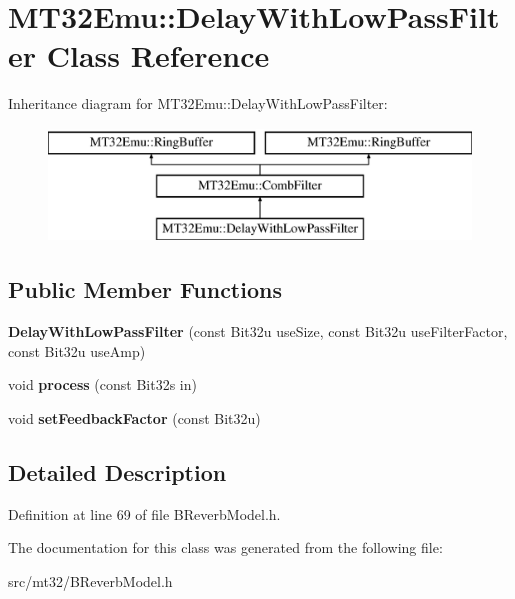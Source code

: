 \hypertarget{classMT32Emu_1_1DelayWithLowPassFilter}{\section{M\-T32\-Emu\-:\-:Delay\-With\-Low\-Pass\-Filter Class Reference}
\label{classMT32Emu_1_1DelayWithLowPassFilter}
}
Inheritance diagram for M\-T32\-Emu\-:\-:Delay\-With\-Low\-Pass\-Filter\-:\begin{figure}[H]
\begin{center}
\leavevmode
\includegraphics[height=3.000000cm]{classMT32Emu_1_1DelayWithLowPassFilter}
\end{center}
\end{figure}
\subsection*{Public Member Functions}
\begin{DoxyCompactItemize}
\item 
\hypertarget{classMT32Emu_1_1DelayWithLowPassFilter_a9266b201695c500a8f367e10c29be1cd}{{\bfseries Delay\-With\-Low\-Pass\-Filter} (const Bit32u use\-Size, const Bit32u use\-Filter\-Factor, const Bit32u use\-Amp)}\label{classMT32Emu_1_1DelayWithLowPassFilter_a9266b201695c500a8f367e10c29be1cd}

\item 
\hypertarget{classMT32Emu_1_1DelayWithLowPassFilter_ab5d2a2b2ecf812c0ad76b0376f1a88a7}{void {\bfseries process} (const Bit32s in)}\label{classMT32Emu_1_1DelayWithLowPassFilter_ab5d2a2b2ecf812c0ad76b0376f1a88a7}

\item 
\hypertarget{classMT32Emu_1_1DelayWithLowPassFilter_adaa4204fc2dfceda32a353f2821f095f}{void {\bfseries set\-Feedback\-Factor} (const Bit32u)}\label{classMT32Emu_1_1DelayWithLowPassFilter_adaa4204fc2dfceda32a353f2821f095f}

\end{DoxyCompactItemize}


\subsection{Detailed Description}


Definition at line 69 of file B\-Reverb\-Model.\-h.



The documentation for this class was generated from the following file\-:\begin{DoxyCompactItemize}
\item 
src/mt32/B\-Reverb\-Model.\-h\end{DoxyCompactItemize}
